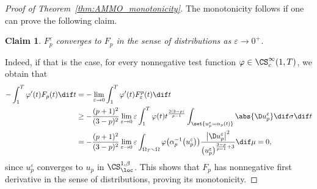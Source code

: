 \documentclass[10pt,a4paper]{amsart}
\numberwithin{equation}{section}
\newtheorem{Claim}[Theorem]{Claim}
\newcounter{case}
\begin{document}
\begin{proof}[Proof of Theorem~\ref{thm:AMMO_monotonicity}]
The monotonicity follows if one can prove the following claim.
\begin{Claim}
$F_p^\varepsilon$ converges to $F_p$ in the sense of distributions as $\varepsilon\to 0^+$.
\end{Claim}
Indeed, if that is the case, for every nonnegative test function $\varphi \in \CS^\infty_c(1,T)$, we obtain that
\begin{align*}
 -\int_1^T \varphi'(t) F_p(t)\dif t & =-\lim_{\varepsilon\to 0} \int_1^T\varphi'(t) F^p_\varepsilon(t)\dif t \\
 & \geq - \frac{(p+1)^2}{(3-p)^2} \lim_{\varepsilon \to 0} \varepsilon \int_1^T \varphi(t) t^{\frac{2(3-p)}{p-1}} \int_{\set{u^\varepsilon_p=\alpha_p(t)}} \abs{ \D u^\varepsilon_p} \dif \sigma\dif t \\
 & =-\frac{(p+1)^2}{(3-p)^2} \lim_{\varepsilon \to 0} \varepsilon \int_{\Omega_T \smallsetminus \Omega} \varphi \big(\alpha_p^{-1}\big(u^\varepsilon_p\big)\big) \frac{ \big| \D u^\varepsilon_p \big|^2}{\big(u^\varepsilon_p\big)^{\frac{3-p}{p-1}+3}} \dif \mu=0,
\end{align*}
since $u_p^\varepsilon$ converges to $u_p$ in $\CS^{1,\beta}_{\loc}$. This shows that $F_p$ has nonnegative first derivative in the sense of distributions, proving its monotonicity.


\end{proof}
\end{document}
